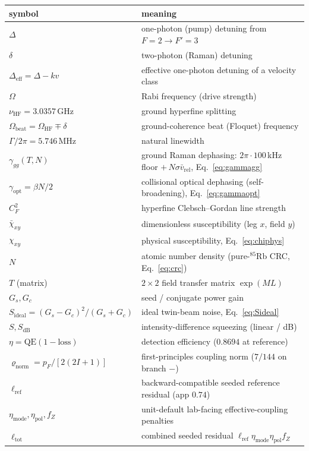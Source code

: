 \documentclass[11pt]{article}
\newcommand{\eff}{\mathrm{eff}}
\newcommand{\HF}{\mathrm{HF}}
\newcommand{\rhobar}{\bar{\chi}}
\begin{document}
\begin{center}
\begin{tabular}{ll}
\toprule
symbol & meaning \\
\midrule
$\Delta$ & one-photon (pump) detuning from $F=2\!\to\!F'=3$ \\
$\delta$ & two-photon (Raman) detuning \\
$\Delta_\eff=\Delta-kv$ & effective one-photon detuning of a velocity class \\
$\Omega$ & Rabi frequency (drive strength) \\
$\nu_{\HF}=3.0357\,$GHz & ground hyperfine splitting \\
$\Omega_{\text{beat}}=\Omega_{\HF}\mp\delta$ & ground-coherence beat (Floquet) frequency \\
$\Gamma/2\pi=5.746\,$MHz & natural linewidth \\
$\gamma_{gg}(T,N)$ & ground Raman dephasing: $2\pi\!\cdot\!100\,$kHz floor $+\,N\sigma\bar v_{\text{rel}}$, Eq.~\eqref{eq:gammagg} \\
$\gamma_{\text{opt}}=\beta N/2$ & collisional optical dephasing (self-broadening), Eq.~\eqref{eq:gammaopt} \\
$C_F^2$ & hyperfine Clebsch--Gordan line strength \\
$\rhobar_{xy}$ & dimensionless susceptibility (leg $x$, field $y$) \\
$\chi_{xy}$ & physical susceptibility, Eq.~\eqref{eq:chiphys} \\
$N$ & atomic number density (pure-$^{85}$Rb CRC, Eq.~\eqref{eq:crc}) \\
$T$ (matrix) & $2\times2$ field transfer matrix $\exp(ML)$ \\
$G_s,G_c$ & seed / conjugate power gain \\
$S_{\text{ideal}}=(G_s-G_c)^2/(G_s+G_c)$ & ideal twin-beam noise, Eq.~\eqref{eq:Sideal} \\
$S,S_{\text{dB}}$ & intensity-difference squeezing (linear / dB) \\
$\eta=\text{QE}(1-\text{loss})$ & detection efficiency ($0.8694$ at reference) \\
$\varrho_{\text{norm}}=p_F/[2(2I+1)]$ & first-principles coupling norm ($7/144$ on branch $-$) \\
$\ell_{\text{ref}}$ & backward-compatible seeded reference residual (app $0.74$) \\
$\eta_{\text{mode}},\eta_{\text{pol}},f_Z$ & unit-default lab-facing effective-coupling penalties \\
$\ell_{\text{tot}}$ & combined seeded residual $\ell_{\text{ref}}\eta_{\text{mode}}\eta_{\text{pol}}f_Z$ \\

\end{tabular}
\end{center}
\end{document}
